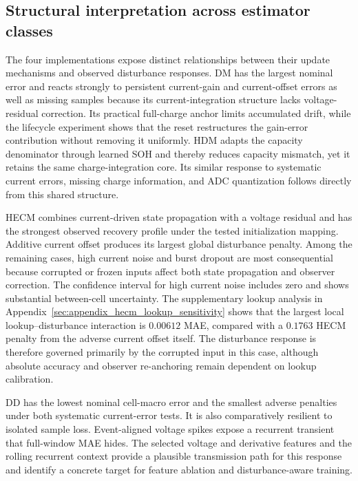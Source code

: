 \documentclass[review,nopreprintline]{elsarticle}
\begin{document}
\subsection{Structural interpretation across estimator classes}
The four implementations expose distinct relationships between their update mechanisms and observed disturbance responses. DM has the largest nominal error and reacts strongly to persistent current-gain and current-offset errors as well as missing samples because its current-integration structure lacks voltage-residual correction. Its practical full-charge anchor limits accumulated drift, while the lifecycle experiment shows that the reset restructures the gain-error contribution without removing it uniformly. HDM adapts the capacity denominator through learned SOH and thereby reduces capacity mismatch, yet it retains the same charge-integration core. Its similar response to systematic current errors, missing charge information, and ADC quantization follows directly from this shared structure.

HECM combines current-driven state propagation with a voltage residual and has the strongest observed recovery profile under the tested initialization mapping. Additive current offset produces its largest global disturbance penalty. Among the remaining cases, high current noise and burst dropout are most consequential because corrupted or frozen inputs affect both state propagation and observer correction. The confidence interval for high current noise includes zero and shows substantial between-cell uncertainty. The supplementary lookup analysis in Appendix~\ref{sec:appendix_hecm_lookup_sensitivity} shows that the largest local lookup--disturbance interaction is $0.00612$ MAE, compared with a $0.1763$ HECM penalty from the adverse current offset itself. The disturbance response is therefore governed primarily by the corrupted input in this case, although absolute accuracy and observer re-anchoring remain dependent on lookup calibration.

DD has the lowest nominal cell-macro error and the smallest adverse penalties under both systematic current-error tests. It is also comparatively resilient to isolated sample loss. Event-aligned voltage spikes expose a recurrent transient that full-window MAE hides. The selected voltage and derivative features and the rolling recurrent context provide a plausible transmission path for this response and identify a concrete target for feature ablation and disturbance-aware training.
\end{document}
